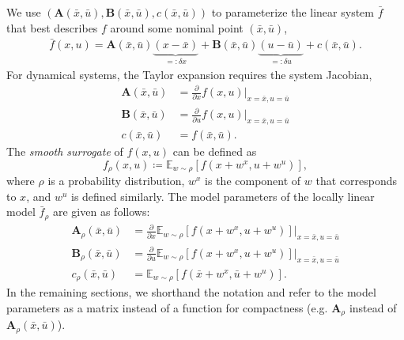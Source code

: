 We use $(\mathbf{A}(\bar{x},\bar{u}),\mathbf{B}(\bar{x},\bar{u}),c(\bar{x},\bar{u}))$ to parameterize the linear system $\bar{f}$ that best describes $f$ around some nominal point $(\bar{x},\bar{u})$, 
\begin{equation}
    \begin{aligned}
    \bar{f}(x,u) = \mathbf{A}(\bar{x},\bar{u})\underbrace{(x-\bar{x})}_{=:\delta x } + \mathbf{B}(\bar{x},\bar{u})\underbrace{(u-\bar{u})}_{=:\delta u} + c(\bar{x},\bar{u}).
    \end{aligned}
\end{equation}
For dynamical systems, the Taylor expansion requires the system Jacobian, 
\begin{equation}\label{eq:linearization}
    \begin{aligned}
    \mathbf{A}(\bar{x},\bar{u}) & = \frac{\partial}{\partial x}f(x,u)|_{x=\bar{x},u=\bar{u}} \\
    \mathbf{B}(\bar{x},\bar{u}) & =\frac{\partial}{\partial u}f(x,u)|_{x=\bar{x},u=\bar{u}} \\
    c(\bar{x},\bar{u}) & = f(\bar{x},\bar{u}).
    \end{aligned}
\end{equation}
The \emph{smooth surrogate} of $f(x,u)$ can be defined as
\begin{equation}
\label{eq:smooth_surrogate_definition}
    f_\rho(x,u) \coloneqq \mathbb{E}_{w\sim\rho}[f(x+w^x,u+w^u)],
\end{equation}
where $\rho$ is a probability distribution, $w^x$ is the component of $w$ that corresponds to $x$, and $w^u$ is defined similarly. The model parameters of the locally linear model $\bar{f}_\rho$ are given as follows:
\begin{equation}
\label{eq:ABc_rho}
    \begin{aligned}
    \mathbf{A}_\rho(\bar{x},\bar{u}) & =  \frac{\partial}{\partial x}\mathbb{E}_{w\sim\rho}[f(x+w^x,u+w^u)]|_{x=\bar{x},u=\bar{u}} \\
    \mathbf{B}_\rho(\bar{x},\bar{u}) & =  \frac{\partial}{\partial u}\mathbb{E}_{w\sim\rho}[f(x+w^x,u+w^u)]|_{x=\bar{x},u=\bar{u}} \\
    c_\rho(\bar{x},\bar{u}) & = \mathbb{E}_{w\sim\rho}[f(\bar{x}+w^x,\bar{u}+w^u)].
    \end{aligned}
\end{equation}
In the remaining sections, we shorthand the notation and refer to the model parameters as a matrix instead of a function for compactness (e.g. $\mathbf{A}_\rho$ instead of $\mathbf{A}_\rho(\bar{x},\bar{u})$). 

